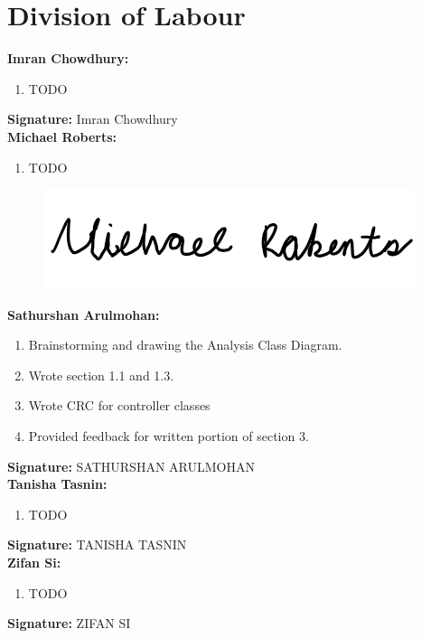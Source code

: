 \documentclass[]{article}
\begin{document}

\appendix
\section{Division of Labour}
\label{sec:division_of_labour}
\textbf{Imran Chowdhury:}
\begin{enumerate}
	\item TODO
\end{enumerate}

\textbf{Signature:} Imran Chowdhury \\

\textbf{Michael Roberts:}
\begin{enumerate}
	\item TODO
\end{enumerate}

\begin{figure}[H]
 	\centering
    \includegraphics[width=\textwidth]{image/A_Michael_Roberts_Signature.png}
\end{figure}

\textbf{Sathurshan Arulmohan:}
\begin{enumerate}
	\item Brainstorming and drawing the Analysis Class Diagram.
	\item Wrote section 1.1 and 1.3.
	\item Wrote CRC for controller classes
	\item Provided feedback for written portion of section 3.
\end{enumerate}

\textbf{Signature:} SATHURSHAN ARULMOHAN \\

\textbf{Tanisha Tasnin:}
\begin{enumerate}
	\item TODO
\end{enumerate}

\textbf{Signature:} TANISHA TASNIN \\

\textbf{Zifan Si:}
\begin{enumerate}
	\item TODO
\end{enumerate}

\textbf{Signature:} ZIFAN SI  \\
\end{document}
